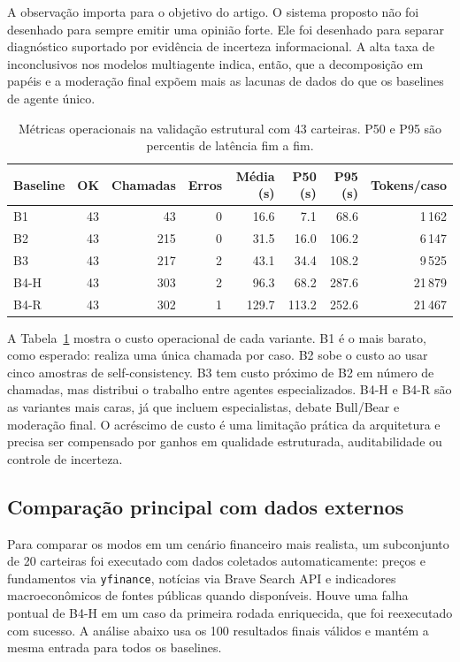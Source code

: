A observação importa para o objetivo do artigo. O sistema proposto não
foi desenhado para sempre emitir uma opinião forte. Ele foi desenhado
para separar diagnóstico suportado por evidência de incerteza
informacional. A alta taxa de inconclusivos nos modelos multiagente
indica, então, que a decomposição em papéis e a moderação final
expõem mais as lacunas de dados do que os baselines de agente único.

\begin{table}[!t]
\centering
\caption{Métricas operacionais na validação estrutural com 43 carteiras. P50 e P95 são percentis de latência fim a fim.}
\label{tab:operacional-estrutural}
\begin{tabular}{@{}lrrrrrrr@{}}
\hline\hline
Baseline & OK & Chamadas & Erros & Média (s) & P50 (s) & P95 (s) & Tokens/caso \\
\hline
B1   & 43 &  43 & 0 &  16.6 &   7.1 &  68.6 &  1\,162 \\
B2   & 43 & 215 & 0 &  31.5 &  16.0 & 106.2 &  6\,147 \\
B3   & 43 & 217 & 2 &  43.1 &  34.4 & 108.2 &  9\,525 \\
B4-H & 43 & 303 & 2 &  96.3 &  68.2 & 287.6 & 21\,879 \\
B4-R & 43 & 302 & 1 & 129.7 & 113.2 & 252.6 & 21\,467 \\
\hline\hline
\end{tabular}
\end{table}

A Tabela~\ref{tab:operacional-estrutural} mostra o custo operacional de
cada variante. B1 é o mais barato, como esperado: realiza uma única
chamada por caso. B2 sobe o custo ao usar cinco amostras de
self-consistency. B3 tem custo próximo de B2 em número de chamadas,
mas distribui o trabalho entre agentes especializados. B4-H e B4-R são
as variantes mais caras, já que incluem especialistas, debate Bull/Bear
e moderação final. O acréscimo de custo é uma limitação prática da
arquitetura e precisa ser compensado por ganhos em qualidade
estruturada, auditabilidade ou controle de incerteza.

\subsection{Comparação principal com dados externos}

Para comparar os modos em um cenário financeiro mais realista, um
subconjunto de 20 carteiras foi executado com dados coletados
automaticamente: preços e fundamentos via \texttt{yfinance}, notícias via
Brave Search API e indicadores macroeconômicos de fontes públicas quando
disponíveis. Houve uma falha pontual de B4-H em um caso da primeira rodada
enriquecida, que foi reexecutado com sucesso. A análise abaixo usa os 100
resultados finais válidos e mantém a mesma entrada para todos os baselines.

